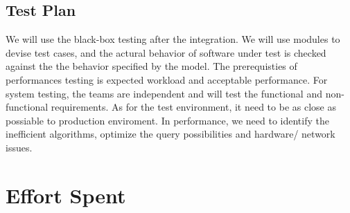 \documentclass[a4paper,12pt]{report}
\begin{document}
\section{Test Plan}
We will use the black-box testing after the integration. We will use modules to devise test cases, and the actural behavior of software under test is checked against the the behavior specified by the model. The prerequisties of performances testing is expected workload and acceptable performance. For system testing, the teams are independent and will test the functional and non-functional requirements. As for the test environment, it need to be as close as possiable to production enviroment. In performance, we need to identify the inefficient algorithms, optimize the query possibilities and hardware/ network issues.



\chapter{Effort Spent}
\end{document}
